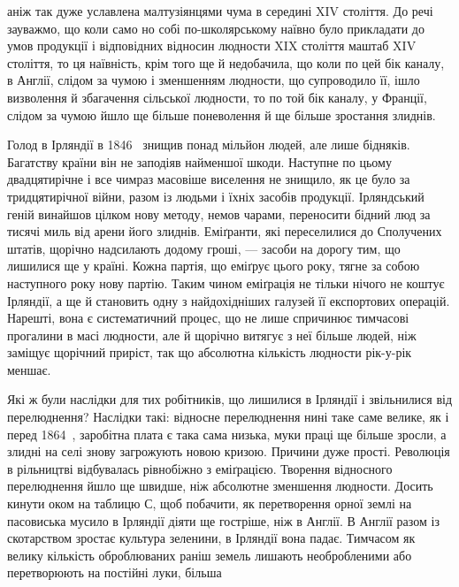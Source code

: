 \parcont{}  %
аніж так дуже уславлена малтузіянцями чума в середині
XIV століття. До речі зауважмо, що коли само но собі по-школярському
наївно було прикладати до умов продукції і відповідних
відносин людности XIX століття маштаб XIV століття,
то ця наївність, крім того ще й недобачила, що коли
по цей бік каналу, в Англії, слідом за чумою і зменшенням
людности, що супроводило її, ішло визволення й збагачення
сільської людности, то по той бік каналу, у Франції, слідом за
чумою йшло ще більше поневолення й ще більше зростання
злиднів.

Голод в Ірляндії в 1846~ знищив понад мільйон людей, але
лише бідняків. Багатству країни він не заподіяв найменшої
шкоди. Наступне по цьому двадцятирічне і все чимраз масовіше
виселення не знищило, як це було за тридцятирічної війни,
разом із людьми і їхніх засобів продукції. Ірляндський геній
винайшов цілком нову методу, немов чарами, переносити бідний
люд за тисячі миль від арени його злиднів. Еміґранти, які переселилися
до Сполучених штатів, щорічно надсилають додому гроші,
— засоби на дорогу тим, що лишилися ще у країні. Кожна
партія, що еміґрує цього року, тягне за собою наступного року
нову партію. Таким чином еміґрація не тільки нічого не коштує
Ірляндії, а ще й становить одну з найдохідніших галузей її експортових
операцій. Нарешті, вона є систематичний процес, що
не лише спричинює тимчасові прогалини в масі людности, але
й щорічно витягує з неї більше людей, ніж заміщує щорічний
приріст, так що абсолютна кількість людности рік-у-рік
меншає.

Які ж були наслідки для тих робітників, що лишилися в Ірляндії
і звільнилися від перелюднення? Наслідки такі: відносне
перелюднення нині таке саме велике, як і перед 1864~, заробітна
плата є така сама низька, муки праці ще більше зросли, а злидні
на селі знову загрожують новою кризою. Причини дуже прості.
Революція в рільництві відбувалась рівнобіжно з еміґрацією.
Творення відносного перелюднення йшло ще швидше, ніж абсолютне
зменшення людности. Досить кинути оком на таблицю
С, щоб побачити, як перетворення орної землі на пасовиська
мусило в Ірляндії діяти ще гостріше, ніж в Англії. В Англії разом
із скотарством зростає культура зеленини, в Ірляндії вона падає.
Тимчасом як велику кількість оброблюваних раніш земель лишають
необробленими або перетворюють на постійні луки, більша
\parbreak{}  %
